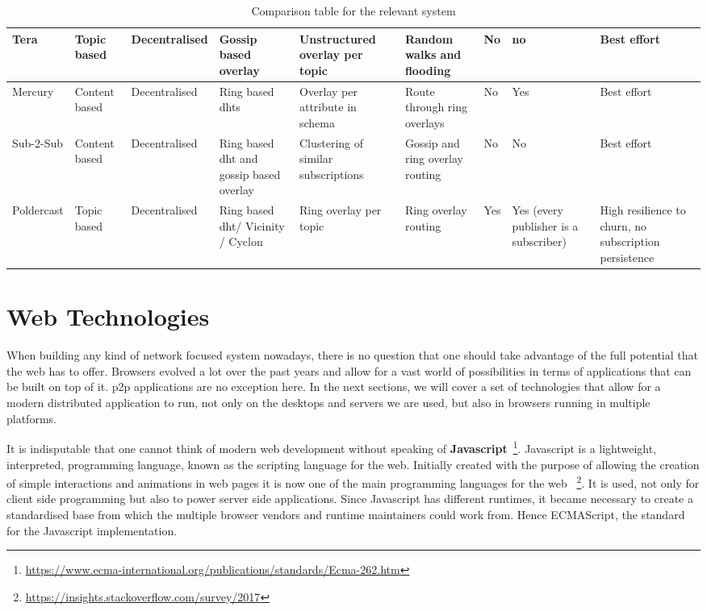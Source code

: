\begin{table}
\begin{tabular}{|P{3cm}|P{2cm}P{2cm}P{2cm}P{2.5cm}P{2cm}P{2cm}P{2cm}P{2cm}|}
    Tera \cite{Baldoni2007} & Topic based & Decentralised & Gossip based overlay & Unstructured overlay per topic & Random walks and flooding & No & no & Best effort \\\hline
    Mercury \cite{Bharambe2002} & Content based & Decentralised & Ring based \acrshort{dht}s & Overlay per attribute in schema & Route through ring overlays & No & Yes & Best effort \\\hline
    Sub-2-Sub \cite{Voulgaris2005} & Content based & Decentralised & Ring based \acrshort{dht} and gossip based overlay & Clustering of similar subscriptions & Gossip and ring overlay routing & No & No & Best effort \\\hline
    Poldercast \cite{Setty2012} & Topic based & Decentralised & Ring based \acrshort{dht}/ Vicinity / Cyclon & Ring overlay per topic & Ring overlay routing & Yes & Yes (every publisher is a subscriber) & High resilience to churn, no subscription persistence \\\hline
    \end{tabular}
  \caption{Comparison table for the relevant system}
  \label{table:relevant-systems}
\end{table}
\section{Web Technologies}\label{web-technologies}

When building any kind of network focused system nowadays, there is no question
that one should take advantage of the full potential that the web has to offer.
Browsers evolved a lot over the past years and allow for a vast world of
possibilities in terms of applications that can be built on top of it. \acrshort{p2p}
applications are no exception here. In the next sections, we will cover a set
of technologies that allow for a modern distributed application to run, not
only on the desktops and servers we are used, but also in browsers running in
multiple platforms.

It is indisputable that one cannot think of modern web development
without speaking of \textbf{Javascript}~\footnote{\url{https://www.ecma-international.org/publications/standards/Ecma-262.htm}}.
Javascript is a lightweight, interpreted, programming language, known as
the scripting language for the web. Initially created with the purpose
of allowing the creation of simple interactions and animations in web
pages it is now one of the main programming languages for the web
~\footnote{\url{https://insights.stackoverflow.com/survey/2017}}. It is used, not
only for client side programming but also to power server side
applications. Since Javascript has different runtimes, it became
necessary to create a standardised base from which the multiple browser
vendors and runtime maintainers could work from. Hence ECMAScript, the standard
for the Javascript implementation.

